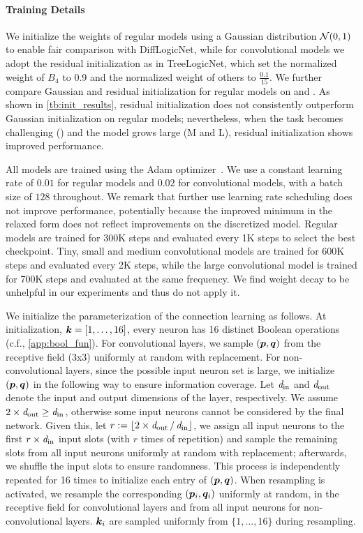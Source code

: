 \paragraph{Training Details}



We initialize the weights of regular models using a Gaussian distribution ${\mathcal{N}}(0,1)$ to enable fair comparison with DiffLogicNet, while for convolutional models we adopt the residual initialization as in TreeLogicNet, which set the normalized weight of $B_4$ to 0.9 and the normalized weight of others to $\frac{0.1}{15}$. We further compare Gaussian and residual initialization for regular models on \mnist and \cifar. As shown in \cref{tb:init_results}, residual initialization does not consistently outperform Gaussian initialization on regular models; nevertheless, when the task becomes challenging (\cifar) and the model grows large (M and L), residual initialization shows improved performance.

All models are trained using the Adam optimizer~\citep{kingma2015adam}. We use a constant learning rate of $0.01$ for regular models and $0.02$ for convolutional models, with a batch size of $128$ throughout. We remark that further use learning rate scheduling does not improve performance, potentially because the improved minimum in the relaxed form does not reflect improvements on the discretized model. Regular models are trained for 300K steps and evaluated every 1K steps to select the best checkpoint. Tiny, small and medium convolutional models are trained for 600K steps and evaluated every 2K steps, while the large convolutional model is trained for 700K steps and evaluated at the same frequency. We find weight decay to be unhelpful in our experiments and thus do not apply it.

We initialize the parameterization of the connection learning as follows. At initialization, ${\bm{k}} = [1, \dots, 16]$, \ie every neuron has 16 distinct Boolean operations (c.f., \cref{app:bool_fun}). For convolutional layers, we sample $({\bm{p}}, {\bm{q}})$ from the receptive field (3x3) uniformly at random with replacement. For non-convolutional layers, since the possible input neuron set is large, we initialize $({\bm{p}}, {\bm{q}})$ in the following way to ensure information coverage. Let $\operatorname*{{\mathit{d}_{\text{in}}}}$ and $\operatorname*{{\mathit{d}_{\text{out}}}}$ denote the input and output dimensions of the layer, respectively. We assume $2 \times \operatorname*{{\mathit{d}_{\text{out}}}} \geq \operatorname*{{\mathit{d}_{\text{in}}}}$, otherwise some input neurons cannot be considered by the final network. Given this, let $r := \lfloor 2 \times \operatorname*{{\mathit{d}_{\text{out}}}} / \operatorname*{{\mathit{d}_{\text{in}}}} \rfloor$, we assign all input neurons to the first $r \times \operatorname*{{\mathit{d}_{\text{in}}}}$ input slots (with $r$ times of repetition) and sample the remaining slots from all input neurons uniformly at random with replacement; afterwards, we shuffle the input slots to ensure randomness. This process is independently repeated for 16 times to initialize each entry of $({\bm{p}}, {\bm{q}})$. When resampling is activated, we resample the corresponding $({\bm{p}}_i, {\bm{q}}_i)$ uniformly at random, in the receptive field for convolutional layers and from all input neurons for non-convolutional layers. ${\bm{k}}_i$ are sampled uniformly from $\{1, \dots, 16\}$ during resampling.



